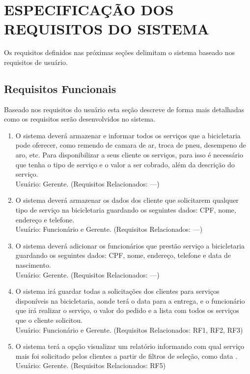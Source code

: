 \documentclass[
	12pt,				%
	openright,
	oneside,			%
	a4paper,			%
	chapter=TITLE,		%
	brazil				%
	]{abntex2}
\begin{document}
\newpage
\chapter{ESPECIFICAÇÃO DOS REQUISITOS DO SISTEMA}

Os requisitos definidos nas próximas seções delimitam o sistema baseado nos requisitos de usuário.


\section{Requisitos Funcionais}


Baseado nos requisitos do usuário esta seção descreve de forma mais detalhadas como os requisitos serão desenvolvidos no sistema.

\begin{enumerate}[label=\bfseries RF\arabic*]

	\item O sistema deverá armazenar e informar todos os serviços que a bicicletaria pode oferecer, como remendo de camara de ar, troca de pneu, desempeno de aro, etc. Para disponibilizar a seus cliente os serviços, para isso é necessário que tenha o tipo de serviço e o valor a ser cobrado, além da descrição do serviço.
\\Usuário: Gerente. (Requisitos Relacionados: ---) 

	\item O sistema deverá armazenar os dados dos cliente que solicitarem qualquer tipo de serviço na bicicletaria guardando os seguintes dados: CPF, nome, endereço e telefone.
\\Usuário: Funcionário e Gerente. (Requisitos Relacionados: ---) 

	\item O sistema deverá adicionar os funcionários que prestão serviço a bicicletaria guardando os seguintes dados: CPF, nome, endereço, telefone e data de nascimento.
\\Usuário: Gerente. (Requisitos Relacionados: ---) 


	\item O sistema irá guardar todas a solicitações dos clientes para serviços disponíveis na bicicletaria, aonde terá o data para a entrega, e o funcionário que irá realizar o serviço, o valor do pedido e a lista com todos os serviços que o cliente solicitou. 
\\Usuário: Funcionário e Gerente. (Requisitos Relacionados: RF1, RF2, RF3) 

	\item O sistema terá a opção visualizar um relatório informando com qual serviço mais foi solicitado pelos clientes a partir de filtros de seleção, como data .
\\Usuário: Gerente. (Requisitos Relacionados: RF5) 


\end{enumerate}
\end{document}
